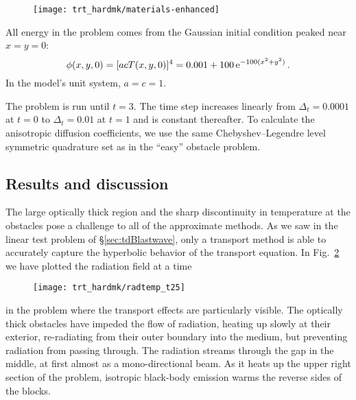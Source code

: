 \begin{figure}[htb]
  \centering
  \texttt{[image: trt\_hardmk/materials-enhanced]}
  \label{fig:hardmkMaterials}
\end{figure}

All energy in the problem comes from the Gaussian initial condition peaked near
$x=y=0$:
\begin{equation*}
  \phi(x,y,0) = [ a c T(x,y,0)]^{4} = 0.001 + 100 \mathop{}\!\mathrm{e}^{-100 (x^2 + y^2) } \,.
\end{equation*}
In the model's unit system, $a=c=1$.

The problem is run until $t=3$. The time step increases linearly from
$\Delta_t=0.0001$ at
$t=0$ to $\Delta_t=0.01$ at $t=1$ and is constant thereafter. To calculate the
anisotropic diffusion coefficients, we use the same Chebyshev--Legendre level
symmetric quadrature set as in the ``easy'' obstacle problem.

\subsection{Results and discussion}

The large optically thick region and the sharp discontinuity in temperature at
the obstacles pose a challenge to all of the approximate methods. As we saw in
the linear test problem of \S\ref{sec:tdBlastwave}, only a transport method is
able to accurately capture the hyperbolic behavior of the transport equation. In
Fig.~\ref{fig:hardmkPseudocolor} we have plotted the radiation field at a time
%
\begin{figure}[tb]
  \centering
  \hspace{-1in}%
  \texttt{[image: trt\_hardmk/radtemp\_t25]}
  \label{fig:hardmkPseudocolor}
\end{figure}
%
in the problem where the transport effects are particularly visible.
The optically thick obstacles have impeded the flow of radiation, heating up
slowly at their exterior, re-radiating from their outer boundary into the
medium, but preventing radiation from passing through. The radiation streams
through the gap in the middle, at first almost as a mono-directional beam. As it
heats up the upper right section of the problem, isotropic black-body emission
warms the reverse sides of the blocks.

